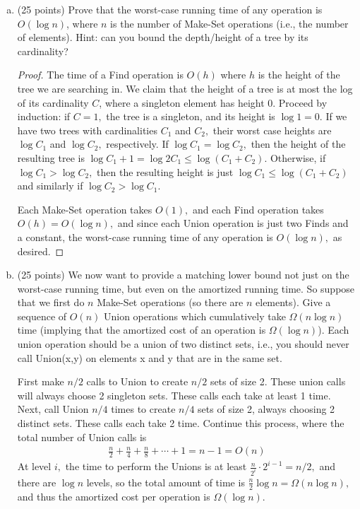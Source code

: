 \documentclass{article}
\begin{document}
\begin{enumerate}[(a)]
	\item (25 points) Prove that the worst-case running time of any operation is $O(\log n)$, where $n$ is the number of Make-Set operations (i.e., the number of elements).  Hint: can you bound the depth/height of a tree by its cardinality?
		\begin{proof}
			The time of a Find operation is $O(h)$ where $h$ is the height of the tree we are searching in. We claim that the height of a tree is at most the log of its cardinality $C$, where a singleton element has height 0. Proceed by induction: if $C=1,$ the tree is a singleton, and its height is $\log 1 = 0.$ If we have two trees with cardinalities $C_1$ and $C_2,$ their worst case heights are $\log C_1$ and $\log C_2,$ respectively. If $\log C_1=\log C_2,$ then the height of the resulting tree is $\log C_1+1=\log 2C_1\le \log(C_1+C_2).$ Otherwise, if $\log C_1>\log C_2,$ then the resulting height is just $\log C_1\le \log(C_1+C_2)$ and similarly if $\log C_2>\log C_1.$ 

			Each Make-Set operation takes $O(1),$ and each Find operation takes $O(h)=O(\log n),$ and since each Union operation is just two Finds and a constant, the worst-case running time of any operation is $O(\log n),$ as desired.
		\end{proof}

	\item (25 points) We now want to provide a matching lower bound not just on the worst-case running time, but even on the amortized running time.  So suppose that we first do $n$ Make-Set operations (so there are $n$ elements).  Give a sequence of $O(n)$ Union operations which cumulatively take $\Omega(n \log n)$ time (implying that the amortized cost of an operation is $\Omega(\log n)$).  Each union operation should be a union of two distinct sets, i.e., you should never call Union(x,y) on elements x and y that are in the same set.
		\begin{soln}
			First make $n/2$ calls to Union to create $n/2$ sets of size 2. These union calls will always choose 2 singleton sets. These calls each take at least 1 time. Next, call Union $n/4$ times to create $n/4$ sets of size 2, always choosing 2 distinct sets. These calls each take 2 time. Continue this process, where the total number of Union calls is
			\begin{align*}
				\frac{n}{2} + \frac{n}{4} + \frac{n}{8} + \cdots + 1 = n-1 = O(n)
			\end{align*}
			At level $i,$ the time to perform the Unions is at least $\frac{n}{2^i}\cdot 2^{i-1} = n/2,$ and there are $\log n$ levels, so the total amount of time is $\frac{n}{2}\log n = \Omega(n\log n),$ and thus the amortized cost per operation is $\Omega(\log n).$
		\end{soln}

\end{enumerate}
\end{document}
